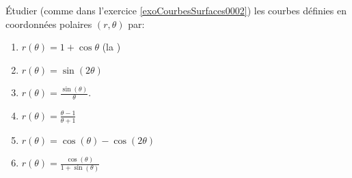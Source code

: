 \begin{exercice}\label{exoCourbesSurfaces0005}

	Étudier (comme dans l'exercice \ref{exoCourbesSurfaces0002}) les courbes définies en coordonnées polaires $(r, \theta )$ par:
	\begin{multicols}{2}
		\begin{enumerate}
			\item\minsyndical
				\label{CSCi}
				$\displaystyle  r(\theta) =1+\cos \theta$ (la )
			\item\minsyndical
				\label{CSCii}
				$\displaystyle  r(\theta) = \sin (2\theta)$
			\item\coolexo
				\label{CSCiii}
				$\displaystyle  r(\theta) = \frac{\sin (\theta)}{\theta}$. 
			\item\coolexo
				\label{CSCiv}
				$\displaystyle r(\theta) = \frac{\theta-1}{\theta + 1}$
			\item\coolexo
				\label{CSCv}
				$\displaystyle r(\theta) = \cos (\theta)-\cos (2\theta)$
			\item\minsyndical
				\label{CSCvi}
				$\displaystyle r(\theta) = \frac{\cos (\theta)}{1 + \sin (\theta)}$
		\end{enumerate}
	\end{multicols}
	

\end{exercice}
